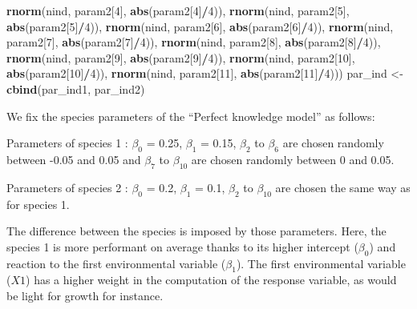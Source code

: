 \documentclass[
]{article}
\newenvironment{Shaded}{\begin{snugshade}}{\end{snugshade}}
\newcommand{\DecValTok}[1]{\textcolor[rgb]{0.00,0.00,0.81}{#1}}
\newcommand{\KeywordTok}[1]{\textcolor[rgb]{0.13,0.29,0.53}{\textbf{#1}}}
\newcommand{\NormalTok}[1]{#1}
\newcommand{\OperatorTok}[1]{\textcolor[rgb]{0.81,0.36,0.00}{\textbf{#1}}}
\newcommand{\StringTok}[1]{\textcolor[rgb]{0.31,0.60,0.02}{#1}}
\begin{document}
\begin{Shaded}
\begin{Highlighting}[]
    \KeywordTok{rnorm}\NormalTok{(nind, param2[}\DecValTok{4}\NormalTok{], }\KeywordTok{abs}\NormalTok{(param2[}\DecValTok{4}\NormalTok{]}\OperatorTok{/}\DecValTok{4}\NormalTok{)), }\KeywordTok{rnorm}\NormalTok{(nind, param2[}\DecValTok{5}\NormalTok{], }
        \KeywordTok{abs}\NormalTok{(param2[}\DecValTok{5}\NormalTok{]}\OperatorTok{/}\DecValTok{4}\NormalTok{)), }\KeywordTok{rnorm}\NormalTok{(nind, param2[}\DecValTok{6}\NormalTok{], }\KeywordTok{abs}\NormalTok{(param2[}\DecValTok{6}\NormalTok{]}\OperatorTok{/}\DecValTok{4}\NormalTok{)), }
    \KeywordTok{rnorm}\NormalTok{(nind, param2[}\DecValTok{7}\NormalTok{], }\KeywordTok{abs}\NormalTok{(param2[}\DecValTok{7}\NormalTok{]}\OperatorTok{/}\DecValTok{4}\NormalTok{)), }\KeywordTok{rnorm}\NormalTok{(nind, param2[}\DecValTok{8}\NormalTok{], }
        \KeywordTok{abs}\NormalTok{(param2[}\DecValTok{8}\NormalTok{]}\OperatorTok{/}\DecValTok{4}\NormalTok{)), }\KeywordTok{rnorm}\NormalTok{(nind, param2[}\DecValTok{9}\NormalTok{], }\KeywordTok{abs}\NormalTok{(param2[}\DecValTok{9}\NormalTok{]}\OperatorTok{/}\DecValTok{4}\NormalTok{)), }
    \KeywordTok{rnorm}\NormalTok{(nind, param2[}\DecValTok{10}\NormalTok{], }\KeywordTok{abs}\NormalTok{(param2[}\DecValTok{10}\NormalTok{]}\OperatorTok{/}\DecValTok{4}\NormalTok{)), }\KeywordTok{rnorm}\NormalTok{(nind, param2[}\DecValTok{11}\NormalTok{], }
        \KeywordTok{abs}\NormalTok{(param2[}\DecValTok{11}\NormalTok{]}\OperatorTok{/}\DecValTok{4}\NormalTok{)))}
\NormalTok{par_ind <-}\StringTok{ }\KeywordTok{cbind}\NormalTok{(par_ind1, par_ind2)}
\end{Highlighting}
\end{Shaded}

We fix the species parameters of the ``Perfect knowledge model'' as
follows:

Parameters of species 1 : \(\beta_0\) = 0.25, \(\beta_1\) = 0.15,
\(\beta_2\) to \(\beta_{6}\) are chosen randomly between -0.05 and 0.05
and \(\beta_{7}\) to \(\beta_{10}\) are chosen randomly between 0 and
0.05.

Parameters of species 2 : \(\beta_0\) = 0.2, \(\beta_1\) = 0.1,
\(\beta_2\) to \(\beta_{10}\) are chosen the same way as for species 1.

The difference between the species is imposed by those parameters. Here,
the species 1 is more performant on average thanks to its higher
intercept (\(\beta_0\)) and reaction to the first environmental variable
(\(\beta_1\)). The first environmental variable (\(X1\)) has a higher
weight in the computation of the response variable, as would be light
for growth for instance.
\end{document}
